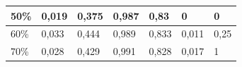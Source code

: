 \documentclass{classrep}
\begin{document}
{\begin{table}[H]
\begin{center}
\begin{tabular}{|l|l|l|l|l|l|l|}
50\%                                                              & 0,019                                                                     & 0,375                                                                      & 0,987                                                          & 0,83                                                              & 0                                                                 & 0                                                                    \\ \hline
60\%                                                              & 0,033                                                                     & 0,444                                                                      & 0,989                                                          & 0,833                                                             & 0,011                                                             & 0,25                                                                 \\ \hline
70\%                                                              & 0,028                                                                     & 0,429                                                                      & 0,991                                                          & 0,828                                                             & 0,017                                                             & 1                                                                    \\ \hline
\end{tabular}
\end{center}
\end{table}

}
\end{document}

